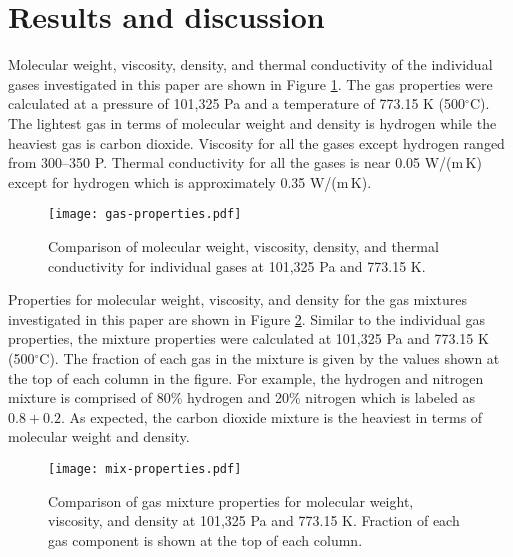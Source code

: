 
\section{Results and discussion}

Molecular weight, viscosity, density, and thermal conductivity of the individual gases investigated in this paper are shown in Figure \ref{fig:gas-properties}. The gas properties were calculated at a pressure of 101,325 Pa and a temperature of 773.15 K (500$^\circ$C). The lightest gas in terms of molecular weight and density is hydrogen while the heaviest gas is carbon dioxide. Viscosity for all the gases except hydrogen ranged from 300--350 \textmugreek P. Thermal conductivity for all the gases is near 0.05 W/(m\,K) except for hydrogen which is approximately 0.35 W/(m\,K).

\begin{figure}[H]
    \centering
    \texttt{[image: gas-properties.pdf]}
    \caption{Comparison of molecular weight, viscosity, density, and thermal conductivity for individual gases at 101,325 Pa and 773.15 K.}
    \label{fig:gas-properties}
\end{figure}

Properties for molecular weight, viscosity, and density for the gas mixtures investigated in this paper are shown in Figure \ref{fig:mix-properties}. Similar to the individual gas properties, the mixture properties were calculated at 101,325 Pa and 773.15 K (500$^\circ$C). The fraction of each gas in the mixture is given by the values shown at the top of each column in the figure. For example, the hydrogen and nitrogen mixture is comprised of 80\% hydrogen and 20\% nitrogen which is labeled as $0.8 + 0.2$. As expected, the carbon dioxide mixture is the heaviest in terms of molecular weight and density.

\begin{figure}[H]
    \centering
    \texttt{[image: mix-properties.pdf]}
    \caption{Comparison of gas mixture properties for molecular weight, viscosity, and density at 101,325 Pa and 773.15 K. Fraction of each gas component is shown at the top of each column.}
    \label{fig:mix-properties}
\end{figure}
